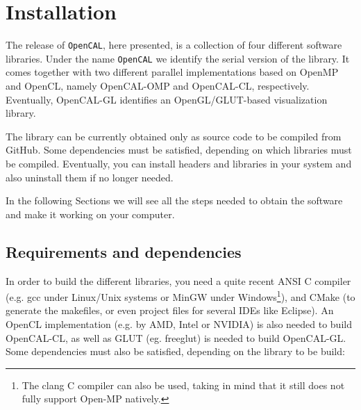 \chapter{Installation} \label{ch:installation}

The release of \verb'OpenCAL', here presented, is a collection of four
different software libraries. Under the name \verb'OpenCAL' we
identify the serial version of the library. It comes together with two
different parallel implementations based on OpenMP and OpenCL, namely
OpenCAL-OMP and OpenCAL-CL, respectively. Eventually, OpenCAL-GL
identifies an OpenGL/GLUT-based visualization library.


The library can be currently obtained only as source code to be
compiled from GitHub. Some dependencies must be satisfied, depending
on which libraries must be compiled. Eventually, you
can install headers and libraries in your system and also uninstall
them if no longer needed.


In the following Sections we will see all the steps needed to obtain
the software and make it working on your computer.

\section{Requirements and dependencies}

In order to build the different libraries, you need a quite recent
ANSI C compiler (e.g. gcc under Linux/Unix systems or MinGW under
Windows\footnote{The clang C compiler can also be used, taking in mind
  that it still does not fully support Open-MP natively.}), and CMake
(to generate the makefiles, or even project files for several IDEs
like Eclipse). An OpenCL implementation (e.g. by AMD, Intel or NVIDIA)
is also needed to build OpenCAL-CL, as well as GLUT (eg. freeglut) is
needed to build OpenCAL-GL. Some dependencies must also be satisfied,
depending on the library to be build:


